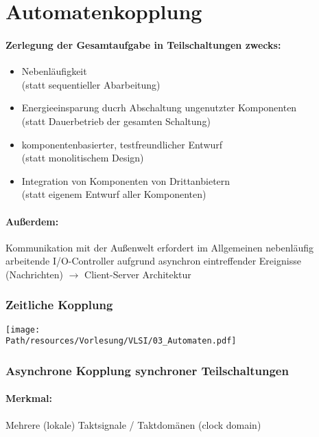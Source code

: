 \section{Automatenkopplung}
	\paragraph{Zerlegung der Gesamtaufgabe in Teilschaltungen zwecks:}
	\begin{itemize}
		\item Nebenläufigkeit\\(statt sequentieller Abarbeitung)
		\item Energieeinsparung ducrh Abschaltung ungenutzter Komponenten\\(statt Dauerbetrieb der gesamten Schaltung)
		\item komponentenbasierter, testfreundlicher Entwurf\\(statt monolitischem Design)
		\item Integration von Komponenten von Drittanbietern\\(statt eigenem Entwurf aller Komponenten)
	\end{itemize}
	
	\paragraph{Außerdem:} 
	Kommunikation mit der Außenwelt erfordert im Allgemeinen nebenläufig arbeitende I/O-Controller aufgrund asynchron eintreffender Ereignisse (Nachrichten) $\rightarrow$ Client-Server Architektur
	
	\subsubsection{Zeitliche Kopplung}
		\begin{center}
			\texttt{[image: \\Path/resources/Vorlesung/VLSI/03\_Automaten.pdf]}
		\end{center}
		
	\subsubsection{Asynchrone Kopplung synchroner Teilschaltungen}
		\paragraph{Merkmal:} Mehrere (lokale) Taktsignale / Taktdomänen (clock domain)
